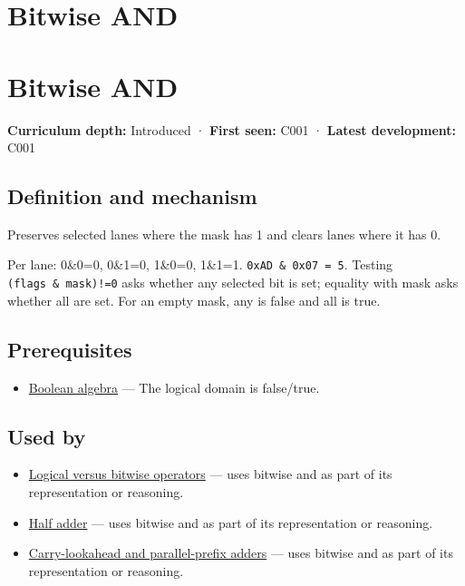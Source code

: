 \hypertarget{appendix-68b52453737c}{}
\section*{Bitwise AND}
\section{Bitwise AND}\label{bitwise-and}

\textbf{Curriculum depth:} Introduced · \textbf{First seen:} C001 · \textbf{Latest development:} C001

\subsection{Definition and mechanism}\label{definition-and-mechanism}

Preserves selected lanes where the mask has 1 and clears lanes where it has 0.

Per lane: 0\&0=0, 0\&1=0, 1\&0=0, 1\&1=1. \texttt{0xAD\ \&\ 0x07\ =\ 5}. Testing \texttt{(flags\ \&\ mask)!=0} asks whether any selected bit is set; equality with mask asks whether all are set. For an empty mask, any is false and all is true.

\subsection{Prerequisites}\label{prerequisites}

\begin{itemize}
\tightlist
\item
  \hyperref[appendix-24475e1596a8]{Boolean algebra} --- The logical domain is false/true.
\end{itemize}

\subsection{Used by}\label{used-by}

\begin{itemize}
\tightlist
\item
  \hyperref[appendix-fe6b457d68d8]{Logical versus bitwise operators} --- uses bitwise and as part of its representation or reasoning.
\item
  \hyperref[appendix-1652d27a8e90]{Half adder} --- uses bitwise and as part of its representation or reasoning.
\item
  \hyperref[appendix-b5c46b2d94ff]{Carry-lookahead and parallel-prefix adders} --- uses bitwise and as part of its representation or reasoning.
\end{itemize}

